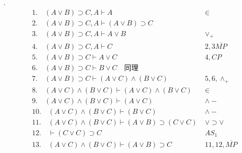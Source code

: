 \documentclass[a4paper]{ctexart}
\begin{document}
.
\begin{align*}
  &1. \quad (A\vee B)\supset C,A \vdash A \quad & \in \\
  &2. \quad (A\vee B)\supset C,A \vdash (A\vee B)\supset C \quad & \\
  &3. \quad (A\vee B)\supset C,A \vdash A\vee B \quad &\vee_+ \\
  &4. \quad (A\vee B)\supset C,A \vdash C \quad &2,3\overline{MP} \\
  &5. \quad (A\vee B)\supset C \vdash A\vee C \quad &4,CP \\
  &6. \quad (A\vee B)\supset C \vdash B\vee C \quad \text{同理} \\
  &7. \quad (A\vee B)\supset C \vdash (A\vee C)\wedge (B\vee C)\quad &5,6,\wedge_+ \\
  &8. \quad (A\vee C)\wedge (B\vee C) \vdash (A\vee C)\wedge (B\vee C) \quad &\in \\
  &9. \quad (A\vee C)\wedge (B\vee C) \vdash (A\vee C) \quad &\wedge- \\
  &10. \quad (A\vee C)\wedge (B\vee C) \vdash (B\vee C) \quad &\wedge- \\
  &11. \quad (A\vee C)\wedge (B\vee C) \vdash (A\vee B)\supset(C\vee C) &\vee\supset\vee \\
  &12. \quad \vdash(C\vee C)\supset C \quad &AS_1 \\
  &13. \quad (A\vee C)\wedge (B\vee C) \vdash (A\vee B)\supset C &11,12,\overline{MP} \\
\end{align*}
\end{document}
